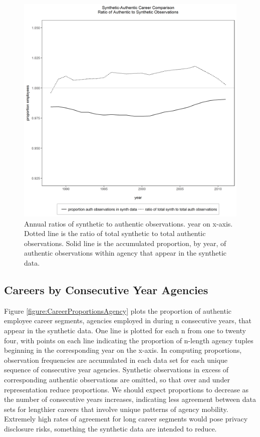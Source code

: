 \documentclass[10pt, letterpaper]{article}
\begin{document}
\begin{spacing}{1.0}
\begin{figure}[h]
    \centering
    \includegraphics[width=5.25in, trim={0 0.85in 0 0.5in}, clip]{TotalObsProportions.png}
    \caption{Annual ratios of synthetic to authentic observations.  year on x-axis.  Dotted line is the ratio of total synthetic to total authentic observations.  Solid line is the accumulated proportion, by year, of authentic observations within agency that appear in the synthetic data.}
    \label{figure:TotalObsProportions}
\end{figure}

\clearpage

\subsection{Careers by Consecutive Year Agencies}

Figure \ref{figure:CareerProportionsAgency} plots the proportion of authentic employee career segments, agencies employed in during n consecutive years, that appear in the synthetic data.  One line is plotted for each n from one to twenty four, with points on each line indicating the proportion of n-length agency tuples beginning in the corresponding year on the x-axis.  In computing proportions, observation frequencies are accumulated in each data set for each unique sequence of consecutive year agencies.  Synthetic observations in excess of corresponding authentic observations are omitted, so that over and under representation reduce proportions.  We should expect proportions to decrease as the number of consecutive years increases, indicating less agreement between data sets for lengthier careers that involve unique patterns of agency mobility.  Extremely high rates of agreement for long career segments would pose privacy disclosure risks, something the synthetic data are intended to reduce.\\


\end{spacing}
\end{document}
